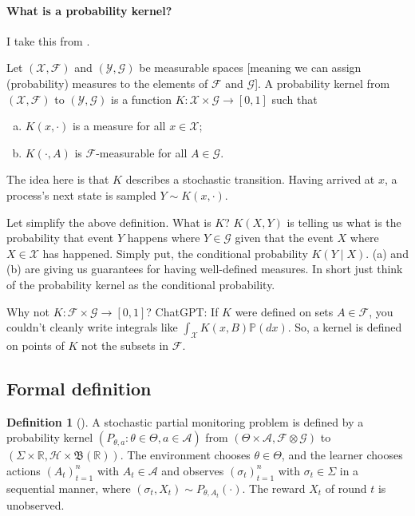 \documentclass[a4paper]{article}
\theoremstyle{definition}
\newtheorem{definition}{Definition}
\newcommand{\cA}{\mathcal{A}}
\newcommand{\cF}{\mathcal{F}}
\newcommand{\cG}{\mathcal{G}}
\newcommand{\cH}{\mathcal{H}}
\newcommand{\cX}{\mathcal{X}}
\newcommand{\cY}{\mathcal{Y}}
\newcommand{\fB}{\mathfrak{B}}
\newcommand{\R}{\mathbb{R}}
\renewcommand{\P}{\mathbb{P}}
\begin{document}
\paragraph{What is a probability kernel?} I take this from \citet[pp. 48]{lattimore2020bandit}.
    
Let $(\cX, \cF)$ and $(\cY, \cG)$ be measurable spaces [meaning we can assign (probability) measures to the elements of $\cF$ and $\cG$]. A probability kernel from $(\cX, \cF)$ to $(\cY, \cG)$ is a function $K: \cX \times \cG \to [0, 1]$ such that
%
\begin{enumerate}[(a)]
    \item $K(x, \cdot)$ is a measure for all $x \in \cX$; 
    \item $K(\cdot, A)$ is $\cF$-measurable for all $A \in \cG$.
\end{enumerate}
%
The idea here is that $K$ describes a stochastic transition. Having arrived at $x$, a process’s next state is sampled $Y \sim K(x, \cdot)$.

Let simplify the above definition. What is $K$? $K(X, Y)$ is telling us what is the probability that event $Y$ happens where $Y \in \cG$ given that the event $X$ where $X \in \cX$ has happened. Simply put, the conditional probability $K(Y \mid X)$. (a) and (b) are giving us guarantees for having well-defined measures. In short just think of the probability kernel as the conditional probability.

Why not $K: \cF \times \cG \to [0, 1]$? ChatGPT: If $K$ were defined on sets $A \in \cF$, you couldn't cleanly write integrals like $\int_\cX K(x, B)\P(dx)$. So, a kernel is defined on points of $K$ not the subsets in $\cF$.
    
%
%
%
\subsection{Formal definition}
\label{sec:pm_formal}
\begin{definition}[{\normalfont\citet[pp. 504]{lattimore2020bandit}}]
\label{def:pm_formal}
    A stochastic partial monitoring problem is defined by a probability kernel $(P_{\theta, a}: \theta \in \Theta, a \in \cA)$ from $(\Theta \times \cA, \cF \otimes \cG)$ to $(\Sigma \times \R, \cH \times \fB(\R))$. The environment chooses $\theta \in \Theta$, and the learner chooses actions $(A_t)_{t = 1}^{n}$ with $A_t \in \cA$ and observes $(\sigma_t)_{t = 1}^n$ with $\sigma_t \in \Sigma$ in a sequential manner, where $(\sigma_t, X_t) \sim P_{\theta, A_t}(\cdot)$. The reward $X_t$ of round $t$ is unobserved. 
\end{definition}
\end{document}
